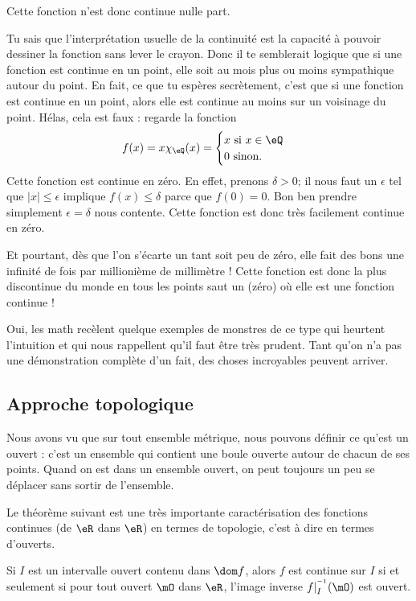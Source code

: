 Cette fonction n'est donc continue nulle part. 

Tu sais que l'interprétation usuelle de la continuité est la capacité à pouvoir dessiner la fonction sans lever le crayon. Donc il te semblerait logique que si une fonction est continue en un point, elle soit au mois plus ou moins sympathique autour du point. En fait, ce que tu espères secrètement, c'est que si une fonction est continue en un point, alors elle est continue au moins sur un voisinage du point. Hélas, cela est faux : regarde la fonction
\[ 
  f(x)=x\chi_{\eQ}(x)=
\begin{cases}
x\text{ si $x\in\eQ$}\\
0\text{ sinon.}
\end{cases}
\]
Cette fonction est continue en zéro. En effet, prenons $\delta>0$; il nous faut un $\epsilon$ tel que $| x |\leq\epsilon$ implique $f(x)\leq \delta$ parce que $f(0)=0$. Bon ben prendre simplement $\epsilon=\delta$ nous contente. Cette fonction est donc très facilement continue en zéro.

Et pourtant, dès que l'on s'écarte un tant soit peu de zéro, elle fait des bons une infinité de fois par millionième de millimètre ! Cette fonction est donc la plus discontinue du monde en tous les points saut un (zéro) où elle est une fonction continue !

Oui, les math recèlent quelque exemples de monstres de ce type qui heurtent l'intuition et qui nous rappellent qu'il faut être très prudent. Tant qu'on n'a pas une démonstration complète d'un fait, des choses incroyables peuvent arriver.

\subsection{Approche topologique}

Nous avons vu que sur tout ensemble métrique, nous pouvons définir ce qu'est un ouvert : c'est un ensemble qui contient une boule ouverte autour de chacun de ses points. Quand on est dans un ensemble ouvert, on peut toujours un peu se déplacer sans sortir de l'ensemble.

Le théorème suivant est une très importante caractérisation des fonctions continues (de $\eR$ dans $\eR$) en termes de topologie, c'est à dire en termes d'ouverts.

\begin{theorem}		\label{ThoContInvOuvert}
Si $I$ est un intervalle ouvert contenu dans $\dom f$, alors $f$ est continue sur $I$ si et seulement si pour tout ouvert $\mO$ dans $\eR$, l'image inverse $f|_I^{^{-1}}(\mO)$ est ouvert.
\end{theorem}

